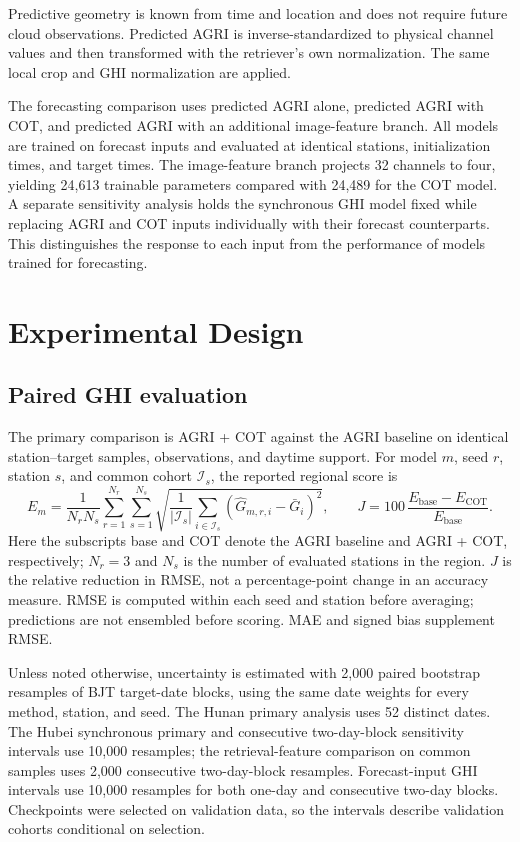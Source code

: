 \documentclass[11pt]{article}
\begin{document}
Predictive geometry is known from time and location and does not require future cloud observations. Predicted AGRI is inverse-standardized to physical channel values and then transformed with the retriever's own normalization. The same local crop and GHI normalization are applied.

The forecasting comparison uses predicted AGRI alone, predicted AGRI with COT, and predicted AGRI with an additional image-feature branch. All models are trained on forecast inputs and evaluated at identical stations, initialization times, and target times. The image-feature branch projects 32 channels to four, yielding 24,613 trainable parameters compared with 24,489 for the COT model. A separate sensitivity analysis holds the synchronous GHI model fixed while replacing AGRI and COT inputs individually with their forecast counterparts. This distinguishes the response to each input from the performance of models trained for forecasting.

\FloatBarrier
\section{Experimental Design}
\subsection{Paired GHI evaluation}
The primary comparison is AGRI + COT against the AGRI baseline on identical station--target samples, observations, and daytime support. For model $m$, seed $r$, station $s$, and common cohort $\mathcal I_s$, the reported regional score is
\begin{equation}
E_m=\frac{1}{N_rN_s}\sum_{r=1}^{N_r}\sum_{s=1}^{N_s}
\sqrt{\frac{1}{|\mathcal I_s|}\sum_{i\in\mathcal I_s}
(\widehat G_{m,r,i}-\bar G_i)^2},
\qquad
J=100\,\frac{E_{\mathrm{base}}-E_{\mathrm{COT}}}{E_{\mathrm{base}}}.
\label{eq:endpoint}
\end{equation}
Here the subscripts base and COT denote the AGRI baseline and AGRI + COT, respectively; $N_r=3$ and $N_s$ is the number of evaluated stations in the region. $J$ is the relative reduction in RMSE, not a percentage-point change in an accuracy measure. RMSE is computed within each seed and station before averaging; predictions are not ensembled before scoring. MAE and signed bias supplement RMSE.

Unless noted otherwise, uncertainty is estimated with 2,000 paired bootstrap resamples of BJT target-date blocks, using the same date weights for every method, station, and seed. The Hunan primary analysis uses 52 distinct dates. The Hubei synchronous primary and consecutive two-day-block sensitivity intervals use 10,000 resamples; the retrieval-feature comparison on common samples uses 2,000 consecutive two-day-block resamples. Forecast-input GHI intervals use 10,000 resamples for both one-day and consecutive two-day blocks. Checkpoints were selected on validation data, so the intervals describe validation cohorts conditional on selection.
\end{document}
